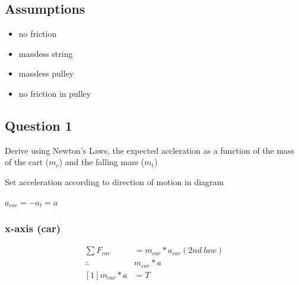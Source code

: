 \documentclass{article}
\begin{document}
\subsection{Assumptions}
\begin{itemize}
\item no friction
\item massless string
\item massless pulley
\item no friction in pulley
\end{itemize}

\pagebreak

\subsection{Question 1}
Derive using Newton's Laws, the expected accleration as a function of the mass of the cart ($m_{c}$) and the falling mass ($m_{t}$)

\begin{figure}[H]
\end{figure}

Set acceleration according to direction of motion in diagram
\begin{center}
$a_{car} = -a_{t} = a$
\end{center}

\subsubsection{x-axis (car)}
\begin{align*}
\sum{F_{car}} 		& = m_{car} * a_{car}	(2nd\ law) \\
\therefore 			& m_{car} * a \\
[1] m_{car} * a 			& = T
\end{align*}
\end{document}
